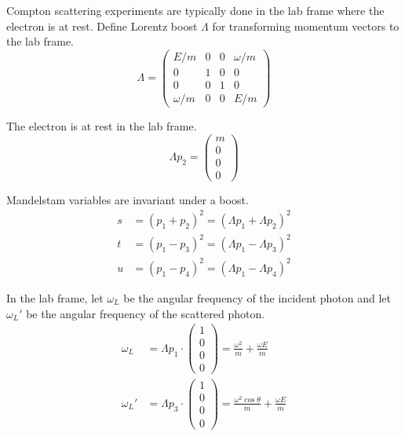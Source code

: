 Compton scattering experiments are typically done in the lab frame where the electron is at rest.
Define Lorentz boost $\Lambda$ for transforming momentum vectors to the lab frame.
\begin{equation*}
\Lambda=
\begin{pmatrix}
E/m & 0 & 0 & \omega/m\\
0 & 1 & 0 & 0\\
0 & 0 & 1 & 0\\
\omega/m & 0 & 0 & E/m
\end{pmatrix}
\end{equation*}

The electron is at rest in the lab frame.
\begin{equation*}
\Lambda p_2=\begin{pmatrix}m\\0\\0\\0\end{pmatrix}
\end{equation*}

Mandelstam variables are invariant under a boost.
\begin{equation*}
\begin{aligned}
s&=(p_1+p_2)^2=(\Lambda p_1+\Lambda p_2)^2
\\
t&=(p_1-p_3)^2=(\Lambda p_1-\Lambda p_3)^2
\\
u&=(p_1-p_4)^2=(\Lambda p_1-\Lambda p_4)^2
\end{aligned}
\end{equation*}

In the lab frame, let $\omega_L$ be the angular frequency of the incident photon
and let $\omega_L'$ be the angular frequency of the scattered photon.
\begin{equation*}
\begin{aligned}
\omega_L&=\Lambda p_1\cdot
\begin{pmatrix}1\\0\\0\\0\end{pmatrix}
=\frac{\omega^2}{m}+\frac{\omega E}{m}
\\[1ex]
\omega_L'&=\Lambda p_3\cdot
\begin{pmatrix}1\\0\\0\\0\end{pmatrix}
=\frac{\omega^2\cos\theta}{m}+\frac{\omega E}{m}
\end{aligned}
\end{equation*}

